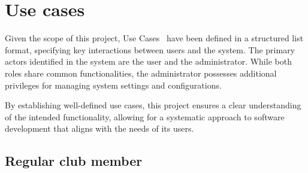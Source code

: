 \section{Use cases}

Given the scope of this project, Use Cases~\cite{useCases} have been defined in a structured list format, specifying key interactions between users and the system. The primary actors identified in the system are the user and the administrator. While both roles share common functionalities, the administrator possesses additional privileges for managing system settings and configurations.

By establishing well-defined use cases, this project ensures a clear understanding of the intended functionality, allowing for a systematic approach to software development that aligns with the needs of its users.

\subsection{Regular club member}

